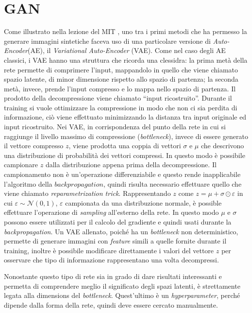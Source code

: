 


\section{GAN}
Come illustrato nella lezione del MIT \cite{MIT_GEN}, uno tra i primi metodi che ha permesso la generare immagini sintetiche faceva uso di una particolare versione di \emph{Auto-Encoder}(AE), il \emph{Variational Auto-Encoder} (VAE).
Come nel caso degli AE classici, i VAE hanno una struttura che ricorda una clessidra: la prima metà della rete permette di comprimere l'input, mappandolo in quello che viene chiamato spazio latente, di minor dimensione rispetto allo spazio di partenza;  la seconda metà, invece, prende l'input compresso e lo mappa nello spazio di partenza.
Il prodotto della decompressione viene chiamato ``input ricostruito''.
Durante il training si vuole ottimizzare la compressione in modo che non ci sia perdita di informazione, ciò viene effettuato minimizzando la distanza tra input originale ed input ricostruito.
Nei VAE, in corrispondenza del punto della rete in cui si raggiunge il livello massimo di compressione (\emph{bottleneck}), invece di essere generato il vettore compresso $z$, viene prodotta una coppia di vettori $\sigma$ e $\mu$ che descrivono una distribuzione di probabilità dei vettori compressi.
In questo modo è possibile campionare $z$ dalla distribuzione appena prima della decompressione.
Il campionamento non è un'operazione differenziabile e questo rende inapplicabile l'algoritmo della $backpropagation$, quindi risulta necessario effettuare quello che viene chiamato \emph{reparametrization trick}.
Rappresentando $z$ come $z = \mu + \sigma \odot \varepsilon$ in cui $\varepsilon \sim \mathcal{N}(0,1)$, $\varepsilon$ campionata da una distribuzione normale, è possible effettuare l'operazione di \emph{sampling} all'esterno della rete.
In questo modo $\mu$ e $\sigma$ possono essere utilizzati per il calcolo del gradiente e quindi usati durante la \emph{backpropagation}.
Un VAE allenato, poiché ha un \emph{bottleneck} non deterministico, permette di generare immagini con \emph{feature} simili a quelle fornite durante il training, inoltre è possibile modificare direttamente i valori del vettore $z$ per osservare che tipo di informazione rappresentano una volta decompressi.

Nonostante questo tipo di rete sia in grado di dare risultati interessanti e permetta di comprendere meglio il significato degli spazi latenti, è strettamente legata alla dimensions del \emph{bottleneck}.
Quest'ultimo è un \emph{hyperparameter}, perché dipende dalla forma della rete, quindi deve essere cercato manualmente.

